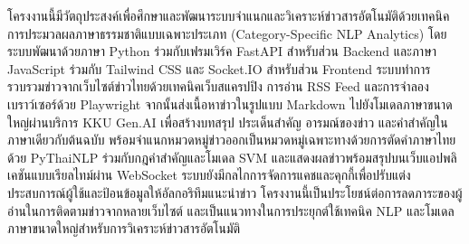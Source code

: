 
โครงงานนี้มีวัตถุประสงค์เพื่อศึกษาและพัฒนาระบบจำแนกและวิเคราะห์ข่าวสารอัตโนมัติด้วยเทคนิคการประมวลผลภาษาธรรมชาติแบบเฉพาะประเภท (Category-Specific NLP Analytics) โดยระบบพัฒนาด้วยภาษา Python ร่วมกับเฟรมเวิร์ค FastAPI สำหรับส่วน Backend และภาษา JavaScript ร่วมกับ Tailwind CSS และ Socket.IO สำหรับส่วน Frontend ระบบทำการรวบรวมข่าวจากเว็บไซต์ข่าวไทยด้วยเทคนิคเว็บสแครปปิง การอ่าน RSS Feed และการจำลองเบราว์เซอร์ด้วย Playwright จากนั้นส่งเนื้อหาข่าวในรูปแบบ Markdown ไปยังโมเดลภาษาขนาดใหญ่ผ่านบริการ KKU Gen.AI เพื่อสร้างบทสรุป ประเด็นสำคัญ อารมณ์ของข่าว และคำสำคัญในภาษาเดียวกับต้นฉบับ พร้อมจำแนกหมวดหมู่ข่าวออกเป็นหมวดหมู่เฉพาะทางด้วยการตัดคำภาษาไทยด้วย PyThaiNLP ร่วมกับกฎคำสำคัญและโมเดล SVM และแสดงผลข่าวพร้อมสรุปบนเว็บแอปพลิเคชันแบบเรียลไทม์ผ่าน WebSocket ระบบยังมีกลไกการจัดการแคชและคุกกี้เพื่อปรับแต่งประสบการณ์ผู้ใช้และป้อนข้อมูลให้อัลกอริทึมแนะนำข่าว โครงงานนี้เป็นประโยชน์ต่อการลดภาระของผู้อ่านในการติดตามข่าวจากหลายเว็บไซต์ และเป็นแนวทางในการประยุกต์ใช้เทคนิค NLP และโมเดลภาษาขนาดใหญ่สำหรับการวิเคราะห์ข่าวสารอัตโนมัติ